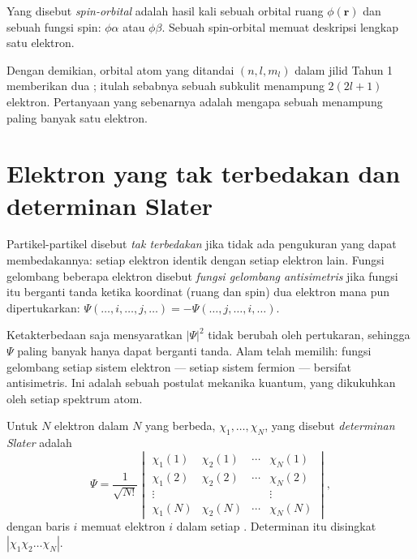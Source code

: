 \begin{definition}\label{def:b3:many-electron-atoms:spin-orbital}
Yang disebut \emph{spin-orbital} adalah hasil kali
sebuah orbital ruang $\phi(\mathbf r)$ dan sebuah fungsi spin: $\phi\alpha$
atau $\phi\beta$. Sebuah spin-orbital memuat deskripsi lengkap satu elektron.
\end{definition}

Dengan demikian, orbital atom yang ditandai $(n, l, m_l)$ dalam jilid Tahun 1
memberikan dua ; itulah sebabnya sebuah subkulit menampung
$2(2l+1)$ elektron. Pertanyaan yang sebenarnya adalah mengapa sebuah
 menampung paling banyak satu elektron.

\section{Elektron yang tak terbedakan dan determinan Slater}

\begin{definition}\label{def:b3:many-electron-atoms:indistinguishable}
Partikel-partikel disebut \emph{tak terbedakan}
jika tidak ada pengukuran yang dapat membedakannya: setiap elektron identik
dengan setiap elektron lain. Fungsi gelombang beberapa elektron disebut
\emph{fungsi gelombang antisimetris} jika
fungsi itu berganti tanda ketika koordinat (ruang dan spin) dua elektron
mana pun dipertukarkan:
$\Psi(\dots,i,\dots,j,\dots) = -\Psi(\dots,j,\dots,i,\dots)$.
\end{definition}

Ketakterbedaan saja mensyaratkan $|\Psi|^2$ tidak berubah oleh pertukaran,
sehingga $\Psi$ paling banyak hanya dapat berganti tanda. Alam telah memilih:
fungsi gelombang setiap sistem elektron --- setiap sistem fermion --- bersifat
antisimetris. Ini adalah sebuah postulat mekanika kuantum, yang dikukuhkan
oleh setiap spektrum atom.

\begin{definition}\label{def:b3:many-electron-atoms:slater}
Untuk $N$ elektron dalam $N$  yang berbeda, $\chi_1, \dots, \chi_N$,
yang disebut \emph{determinan Slater} adalah
\[
\Psi = \frac{1}{\sqrt{N!}}\begin{vmatrix}
\chi_1(1) & \chi_2(1) & \cdots & \chi_N(1)\\
\chi_1(2) & \chi_2(2) & \cdots & \chi_N(2)\\
\vdots & & & \vdots\\
\chi_1(N) & \chi_2(N) & \cdots & \chi_N(N)
\end{vmatrix},
\]
dengan baris $i$ memuat elektron $i$ dalam setiap . Determinan
itu disingkat $|\chi_1\chi_2\dots\chi_N|$.
\end{definition}

